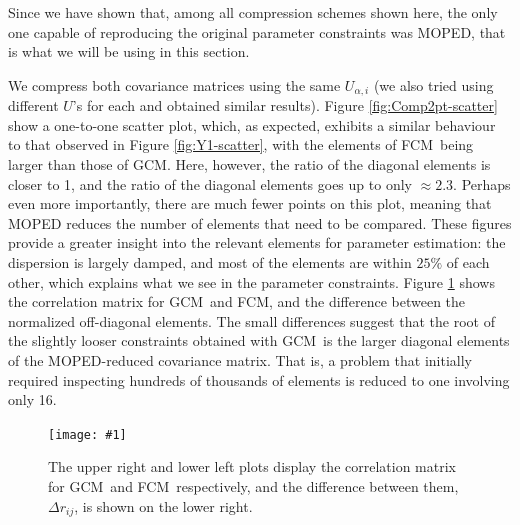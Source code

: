 \documentclass[twocolumn]{\docclass}
\newcommand{\sfig}[2]{
	\texttt{[image: \#1]}
}
\newcommand{\Sfig}[2]{
	\begin{figure}[thbp]
		\sfig{../figures/#1.pdf}{\columnwidth}
		\caption{{\small #2}}
		\label{fig:#1}
	\end{figure}
}
\newcommand{\rf}[1]{Figure \ref{fig:#1}}
\newcommand\full{FCM}
\newcommand\gaussian{GCM}
\newcommand\tq[1]{{\bf [Tq: #1]}}
\begin{document}
	Since we have shown that, among all compression schemes shown here, the only one capable of reproducing the original parameter constraints was MOPED, that is what we will be using in this section.
	
	We compress both covariance matrices using the same $U_{\alpha, i}$ (we also tried using different $U$'s for each and obtained similar results).
	\rf{Comp2pt-scatter} show a one-to-one scatter plot, which, as expected, exhibits a similar behaviour to that observed in \rf{Y1-scatter}, with the elements of \full\ being larger than those of \gaussian. Here, however, the ratio of the diagonal elements is closer to 1, and the ratio of the diagonal elements goes up to only $\approx 2.3$. Perhaps even more importantly, there are much fewer points on this plot, meaning that MOPED reduces the number of elements that need to be compared. These figures provide a greater insight into the relevant elements for parameter estimation: the dispersion is largely damped, and most of the elements are within $25\%$ of each other, which explains what we see in the parameter constraints. \rf{Comp2pt-correlation} shows the correlation matrix for \gaussian\ and \full, and the difference between the normalized off-diagonal elements. The small differences suggest that the root of the slightly looser constraints obtained with \gaussian\ is the larger diagonal elements of the MOPED-reduced covariance matrix. That is, a problem that initially required inspecting hundreds of thousands of elements is reduced to one involving only 16.
	
	\Sfig{Comp2pt-correlation}{The upper right and lower left plots display the correlation matrix for \gaussian\ and \full\ respectively, and the difference between them, $\Delta r_{ij}$, is shown on the lower right.} %
	
\end{document}
